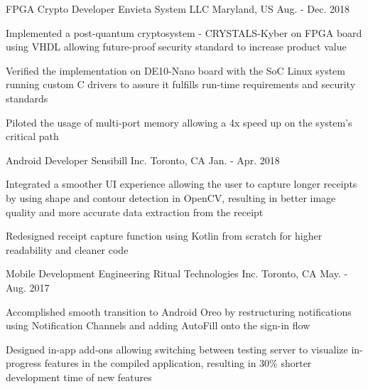 


\begin{cventries}


\cventry
{FPGA Crypto Developer} %
{Envieta System LLC} %
{Maryland, US} %
{Aug. - Dec. 2018} %
{ %
\begin{cvitems}
\item {Implemented a post-quantum cryptosystem - CRYSTALS-Kyber on FPGA board using VHDL allowing
future-proof security standard to increase product value}
\item {Verified the implementation on DE10-Nano board with the SoC Linux system running custom C drivers
to assure it fulfills run-time requirements and security standards}
\item {Piloted the usage of multi-port memory allowing a 4x speed up on the system’s critical path}
\end{cvitems}
}


\cventry
{Android Developer} %
{Sensibill Inc.} %
{Toronto, CA} %
{Jan. - Apr. 2018} %
{ %
\begin{cvitems}
\item {Integrated a smoother UI experience allowing the user to capture longer receipts by using shape and
contour detection in OpenCV, resulting in better image quality and more accurate data extraction from
the receipt}
\item {Redesigned receipt capture function using Kotlin from scratch for higher readability and cleaner code}
\end{cvitems}
}


\cventry
{Mobile Development Engineering} %
{Ritual Technologies Inc.} %
{Toronto, CA} %
{May. - Aug. 2017} %
{ %
\begin{cvitems}
\item {Accomplished smooth transition to Android Oreo by restructuring notifications using Notification
Channels and adding AutoFill onto the sign-in flow}
\item {Designed in-app add-ons allowing switching between testing server to visualize in-progress features in
the compiled application, resulting in 30\% shorter development time of new features}
\end{cvitems} 
}


\end{cventries}
